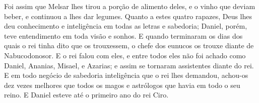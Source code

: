 {Foi assim que Melsar lhes tirou a porção de alimento deles, e o vinho que deviam beber, e continuou a lhes dar legumes.
Quanto a estes quatro rapazes, Deus lhes deu conhecimento e inteligência em todas as letras e sabedoria; Daniel, porém, teve entendimento em toda visão e sonhos.
E quando terminaram os dias dos quais o rei tinha dito que os trouxessem, o chefe dos eunucos os trouxe diante de Nabucodonosor.
E o rei falou com eles, e entre todos eles não foi achado
{} como Daniel, Ananias, Misael, e Azarias; e assim se tornaram assistentes diante do rei.
E em todo negócio de sabedoria
{} inteligência que o rei lhes demandou, achou-os dez vezes melhores que todos os magos e astrólogos que havia em todo o seu reino.
E Daniel esteve até o primeiro ano do rei Ciro.

\par }

